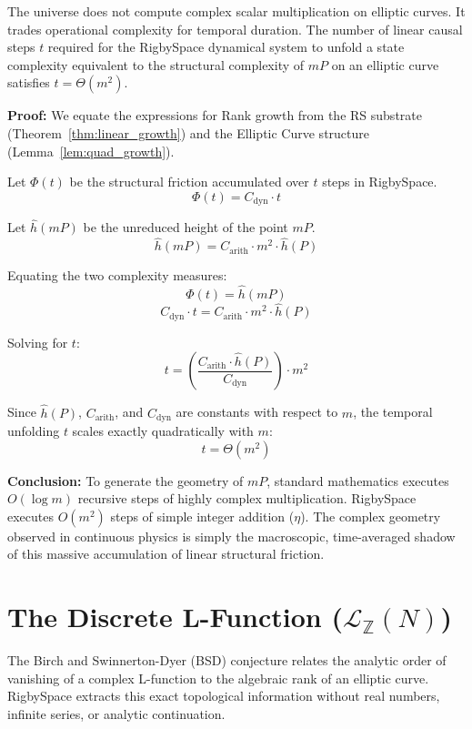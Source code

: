 \documentclass[11pt, letterpaper]{article}
\newcommand{\Z}{\mathbb{Z}}
\newcommand{\aop}{\eta}
\begin{document}
\begin{theorem}\label{thm:rigby_tate}
\begin{rsbox}
The universe does not compute complex scalar multiplication on elliptic curves. It trades operational complexity for temporal duration. The number of linear causal steps $t$ required for the RigbySpace dynamical system to unfold a state complexity equivalent to the structural complexity of $mP$ on an elliptic curve satisfies $t = \Theta(m^2)$.

\textbf{Proof:}
We equate the expressions for Rank growth from the RS substrate (Theorem~\ref{thm:linear_growth}) and the Elliptic Curve structure (Lemma~\ref{lem:quad_growth}).

Let $\Phi(t)$ be the structural friction accumulated over $t$ steps in RigbySpace.
\[ \Phi(t) = C_{\text{dyn}} \cdot t \]

Let $\hat{h}(mP)$ be the unreduced height of the point $mP$.
\[ \hat{h}(mP) = C_{\text{arith}} \cdot m^2 \cdot \hat{h}(P) \]

Equating the two complexity measures:
\[ \Phi(t) = \hat{h}(mP) \]
\[ C_{\text{dyn}} \cdot t = C_{\text{arith}} \cdot m^2 \cdot \hat{h}(P) \]

Solving for $t$:
\[ t = \left( \frac{C_{\text{arith}} \cdot \hat{h}(P)}{C_{\text{dyn}}} \right) \cdot m^2 \]

Since $\hat{h}(P)$, $C_{\text{arith}}$, and $C_{\text{dyn}}$ are constants with respect to $m$, the temporal unfolding $t$ scales exactly quadratically with $m$:
\[ t = \Theta(m^2) \]

\textbf{Conclusion:}
To generate the geometry of $mP$, standard mathematics executes $O(\log m)$ recursive steps of highly complex multiplication. RigbySpace executes $O(m^2)$ steps of simple integer addition ($\aop$). The complex geometry observed in continuous physics is simply the macroscopic, time-averaged shadow of this massive accumulation of linear structural friction.
\end{rsbox}
\end{theorem}

\section{The Discrete L-Function ($\mathcal{L}_{\Z}(N)$)}

The Birch and Swinnerton-Dyer (BSD) conjecture relates the analytic order of vanishing of a complex L-function to the algebraic rank of an elliptic curve. RigbySpace extracts this exact topological information without real numbers, infinite series, or analytic continuation.
\end{document}
